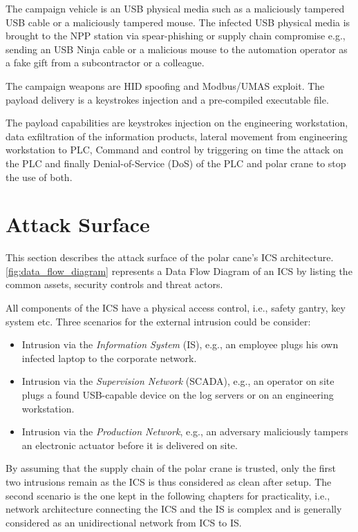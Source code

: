 The campaign vehicle is an USB physical media such as a maliciously tampered USB cable or a maliciously tampered mouse. The infected USB physical media is brought to the NPP station via spear-phishing or supply chain compromise e.g., sending an USB Ninja cable or a malicious mouse to the automation operator as a fake gift from a subcontractor or a colleague.

The campaign weapons are HID spoofing and Modbus/UMAS exploit. The payload delivery is a keystrokes injection and a pre-compiled executable file. 

The payload capabilities are keystrokes injection on the engineering workstation, data exfiltration of the information products, lateral movement from engineering workstation to PLC, Command and control by triggering on time the attack on the PLC and finally Denial-of-Service (DoS) of the PLC and polar crane to stop the use of both. 

\section{Attack Surface}

This section describes the attack surface of the polar cane's ICS architecture. \autoref{fig:data_flow_diagram} represents a Data Flow Diagram of an ICS by listing the common assets, security controls and threat actors. 

All components of the ICS have a physical access control, i.e., safety gantry, key system etc. Three scenarios for the external intrusion could be consider:

\begin{itemize}
    \item Intrusion via the \emph{Information System} (IS), e.g., an employee plugs his own infected laptop to the corporate network.
    \item Intrusion via the \emph{Supervision Network} (SCADA), e.g., an operator on site plugs a found USB-capable device on the log servers or on an engineering workstation.
    \item Intrusion via the \emph{Production Network}, e.g., an adversary maliciously tampers an electronic actuator before it is delivered on site. 
\end{itemize}

By assuming that the supply chain of the polar crane is trusted, only the first two intrusions remain as the ICS is thus considered as clean after setup. The second scenario is the one kept in the following chapters for practicality, i.e., network architecture connecting the ICS and the IS is complex and is generally considered as an unidirectional network from ICS to IS.